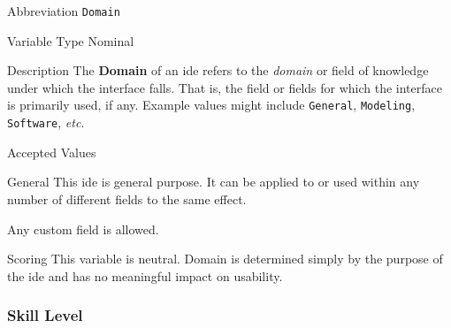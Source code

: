\begin{AlignedDesc}
  \item[Abbreviation] \texttt{Domain}

  \item[Variable Type] Nominal

  \item[Description] The \textbf{Domain} of an \ac{ide} refers to the
  \textit{domain} or field of knowledge under which the interface falls.
  That is, the field or fields for which the interface is primarily used,
  if any. Example values might include \texttt{General}, \texttt{Modeling},
  \texttt{Software}, \textit{etc}.

  \item[Accepted Values]

  \begin{AlignedDesc}
    \item[General] This \ac{ide} is general purpose. It can be applied to
    or used within any number of different fields to the same effect.
    \item[\textellipsis] Any custom field is allowed.
  \end{AlignedDesc}

  \item[Scoring] This variable is neutral. Domain is determined simply by
  the purpose of the \ac{ide} and has no meaningful impact on usability.

\end{AlignedDesc}

\subsubsection{Skill Level}
\label{subsubsec:skill}

